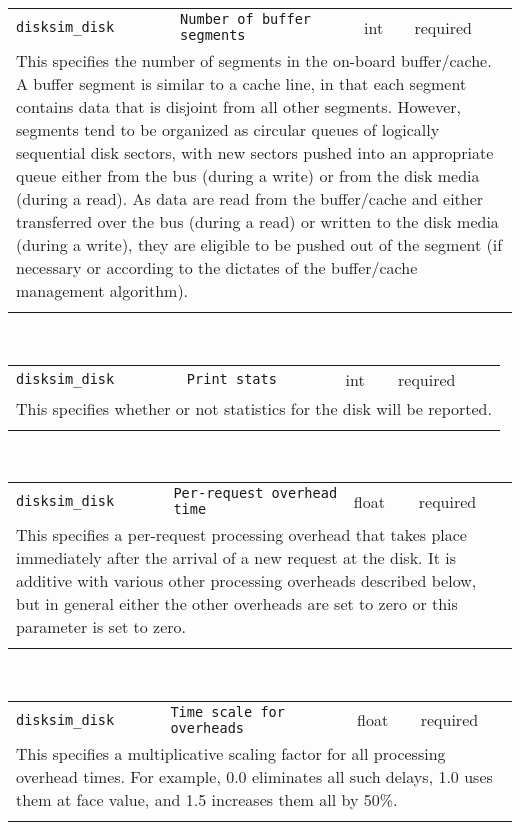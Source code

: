 \noindent 
\begin{tabular}{|p{1.5in}|p{3.5in}|p{0.5in}|p{0.5in}|}
\cline{1-4}
\texttt{disksim\_disk} & \texttt{Number of buffer segments} & int & required \\ 
\cline{1-4}
\multicolumn{4}{|p{6in}|}{
This specifies the number of segments in the on-board buffer/cache. A
buffer segment is similar to a cache line, in that each segment
contains data that is disjoint from all other segments. However,
segments tend to be organized as circular queues of logically
sequential disk sectors, with new sectors pushed into an appropriate
queue either from the bus (during a write) or from the disk media
(during a read). As data are read from the buffer/cache and either
transferred over the bus (during a read) or written to the disk media
(during a write), they are eligible to be pushed out of the segment
(if necessary or according to the dictates of the buffer/cache
management algorithm).
}\\ 
\cline{1-4}
\multicolumn{4}{p{5in}}{}\\
\end{tabular}\\ 
\noindent 
\begin{tabular}{|p{1.5in}|p{3.5in}|p{0.5in}|p{0.5in}|}
\cline{1-4}
\texttt{disksim\_disk} & \texttt{Print stats} & int & required \\ 
\cline{1-4}
\multicolumn{4}{|p{6in}|}{
This specifies whether or not statistics for the disk will be reported.
}\\ 
\cline{1-4}
\multicolumn{4}{p{5in}}{}\\
\end{tabular}\\ 
\noindent 
\begin{tabular}{|p{1.5in}|p{3.5in}|p{0.5in}|p{0.5in}|}
\cline{1-4}
\texttt{disksim\_disk} & \texttt{Per-request overhead time} & float & required \\ 
\cline{1-4}
\multicolumn{4}{|p{6in}|}{
This specifies a per-request processing overhead that takes place
immediately after the arrival of a new request at the disk. It is
additive with various other processing overheads described below, but
in general either the other overheads are set to zero or this
parameter is set to zero.
}\\ 
\cline{1-4}
\multicolumn{4}{p{5in}}{}\\
\end{tabular}\\ 
\noindent 
\begin{tabular}{|p{1.5in}|p{3.5in}|p{0.5in}|p{0.5in}|}
\cline{1-4}
\texttt{disksim\_disk} & \texttt{Time scale for overheads} & float & required \\ 
\cline{1-4}
\multicolumn{4}{|p{6in}|}{
This specifies a multiplicative scaling factor for all processing overhead
times. For example, 0.0 eliminates all such delays, 1.0 uses them at
face value, and 1.5 increases them all by 50\%.
}\\ 
\cline{1-4}
\multicolumn{4}{p{5in}}{}\\
\end{tabular}\\ 
